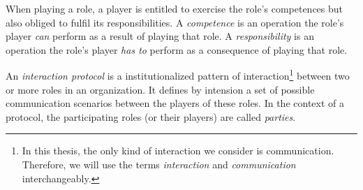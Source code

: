When playing a role, a player is entitled to exercise the role's competences but also obliged to fulfil its responsibilities.
A \textit{competence} is an operation the role's player \textit{can} perform as a result of playing that role.
A \textit{responsibility} is an operation the role's player \textit{has to} perform as a consequence of playing that role.

An \textit{interaction protocol} is a institutionalized pattern of interaction\footnote{In this thesis, the only kind of interaction we consider is communication. Therefore, we will use the terms \textit{interaction} and \textit{communication} interchangeably.} between two or more roles in an organization.
It defines by intension a set of possible communication scenarios between the players of these roles.
In the context of a protocol, the participating roles (or their players) are called \textit{parties}.